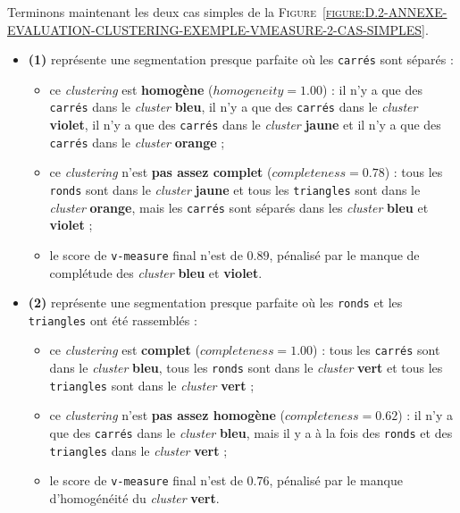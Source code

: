 		Terminons maintenant les deux cas simples de la \textsc{Figure~\ref{figure:D.2-ANNEXE-EVALUATION-CLUSTERING-EXEMPLE-VMEASURE-2-CAS-SIMPLES}}.
		\begin{itemize}
			\item \textbf{(1)} représente une segmentation presque parfaite où les \texttt{carrés} sont séparés :
			\begin{itemize}
				\item ce \textit{clustering} est \textbf{homogène} ($homogeneity=1.00$) : il n'y a que des \texttt{carrés} dans le \textit{cluster} \textbf{\textcolor{colorSilverLakeBlue}{bleu}}, il n'y a que des \texttt{carrés} dans le \textit{cluster} \textbf{\textcolor{colorDarkPastelPurple}{violet}}, il n'y a que des \texttt{carrés} dans le \textit{cluster} \textbf{\textcolor{colorMinionYellow}{jaune}} et il n'y a que des \texttt{carrés} dans le \textit{cluster} \textbf{\textcolor{colorCarrotOrange}{orange}} ;
				\item ce \textit{clustering} n'est \textbf{pas assez complet} ($completeness=0.78$) : tous les \texttt{ronds} sont dans le \textit{cluster} \textbf{\textcolor{colorMinionYellow}{jaune}} et tous les \texttt{triangles} sont dans le \textit{cluster} \textbf{\textcolor{colorCarrotOrange}{orange}}, mais les \texttt{carrés} sont séparés dans les \textit{cluster} \textbf{\textcolor{colorSilverLakeBlue}{bleu}} et \textbf{\textcolor{colorDarkPastelPurple}{violet}} ;
				\item le score de \texttt{v-measure} final n'est de $0.89$, pénalisé par le manque de complétude des \textit{cluster} \textbf{\textcolor{colorSilverLakeBlue}{bleu}} et \textbf{\textcolor{colorDarkPastelPurple}{violet}}.
			\end{itemize}
			\item \textbf{(2)} représente une segmentation presque parfaite où les \texttt{ronds} et les \texttt{triangles} ont été rassemblés :
			\begin{itemize}
				\item ce \textit{clustering} est \textbf{complet} ($completeness=1.00$) : tous les \texttt{carrés} sont dans le \textit{cluster} \textbf{\textcolor{colorSilverLakeBlue}{bleu}}, tous les \texttt{ronds} sont dans le \textit{cluster} \textbf{\textcolor{colorDarkPastelGreen}{vert}} et tous les \texttt{triangles} sont dans le \textit{cluster} \textbf{\textcolor{colorDarkPastelGreen}{vert}} ;
				\item ce \textit{clustering} n'est \textbf{pas assez homogène} ($completeness=0.62$) : il n'y a que des \texttt{carrés} dans le \textit{cluster} \textbf{\textcolor{colorSilverLakeBlue}{bleu}}, mais il y a à la fois des \texttt{ronds} et des \texttt{triangles} dans le \textit{cluster} \textbf{\textcolor{colorDarkPastelGreen}{vert}} ;
				\item le score de \texttt{v-measure} final n'est de $0.76$, pénalisé par le manque d'homogénéité du \textit{cluster} \textbf{\textcolor{colorDarkPastelGreen}{vert}}.
			\end{itemize}
		\end{itemize}
	
	